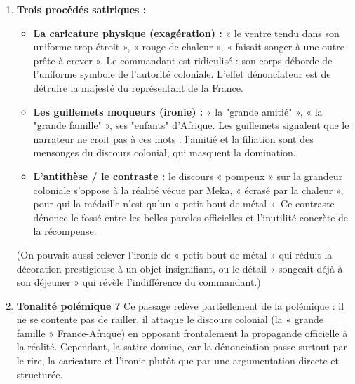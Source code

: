\documentclass[11pt]{article}
\newcommand{\cle}[1]{{\popxbold\color{popdark}#1}}
\begin{document}
\begin{corrige}
\begin{enumerate}
\item \textbf{Trois procédés satiriques :}
\begin{itemize}
\item \textbf{La caricature physique (exagération) :} « le ventre tendu dans son uniforme trop étroit », « rouge de chaleur », « faisait songer à une outre prête à crever ». Le commandant est ridiculisé : son corps déborde de l'uniforme symbole de l'autorité coloniale. L'effet dénonciateur est de détruire la majesté du représentant de la France.
\item \textbf{Les guillemets moqueurs (ironie) :} « la "grande amitié" », « la "grande famille" », ses "enfants" d'Afrique. Les guillemets signalent que le narrateur ne croit pas à ces mots : l'amitié et la filiation sont des mensonges du discours colonial, qui masquent la domination.
\item \textbf{L'antithèse / le contraste :} le discours « pompeux » sur la grandeur coloniale s'oppose à la réalité vécue par Meka, « écrasé par la chaleur », pour qui la médaille n'est qu'un « petit bout de métal ». Ce contraste dénonce le fossé entre les belles paroles officielles et l'inutilité concrète de la récompense.
\end{itemize}
(On pouvait aussi relever l'ironie de « petit bout de métal » qui réduit la décoration prestigieuse à un objet insignifiant, ou le détail « songeait déjà à son déjeuner » qui révèle l'indifférence du commandant.)
\item \textbf{Tonalité polémique ?} Ce passage relève partiellement de la polémique : il ne se contente pas de railler, il attaque le discours colonial (la « grande famille » France-Afrique) en opposant frontalement la propagande officielle à la réalité. Cependant, la \cle{satire} domine, car la dénonciation passe surtout par le rire, la caricature et l'ironie plutôt que par une argumentation directe et structurée.
\end{enumerate}
\end{corrige}
\end{document}
